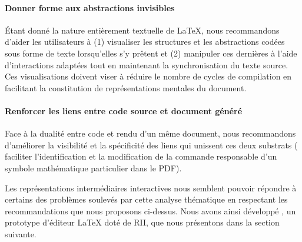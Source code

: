 \paragraph{Donner forme aux abstractions invisibles}
Étant donné la nature entièrement textuelle de \LaTeX{}, nous recommandons d'aider les utilisateurs à (1) visualiser les structures et les abstractions codées sous forme de texte lorsqu'elles s'y prêtent et (2) manipuler ces dernières à l'aide d'interactions adaptées tout en maintenant la synchronisation du texte source.
Ces visualisations doivent viser à réduire le nombre de cycles de compilation en facilitant la constitution de représentations mentales du document.

\paragraph{Renforcer les liens entre code source et document généré}
Face à la dualité entre code et rendu d'un même document, nous recommandons d'améliorer la visibilité et la spécificité des liens qui unissent ces deux substrats (\eg{} faciliter l'identification et la modification de la commande responsable d'un symbole mathématique particulier dans le PDF).

Les représentations intermédiaires interactives nous semblent pouvoir répondre à certains des problèmes soulevés par cette analyse thématique en respectant les recommandations que nous proposons ci-dessus.
Nous avons ainsi développé \iLaTeX, un prototype d'éditeur \LaTeX{} doté de RII, que nous présentons dans la section suivante.